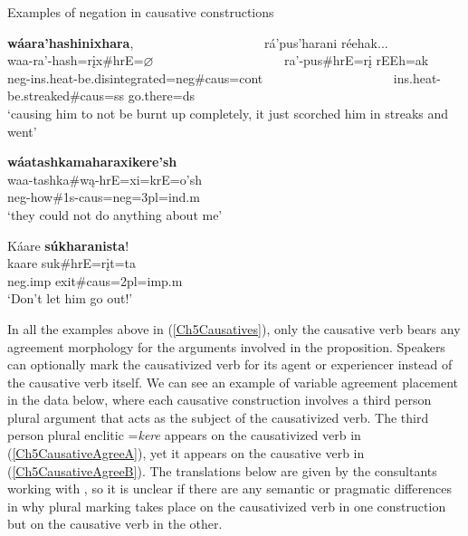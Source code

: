 \begin{exe}
    \item\label{Ch5Causatives2} Examples of negation in causative constructions

    \begin{xlist}
        \item\label{Ch5CausativesE} \glll \textbf{wáara'hashinixhara}, ~ ~ ~ ~ ~ ~ ~ ~ ~ ~ ~ ~ rá'pus'harani réehak...\\
	waa-ra'-hash=rįx\#hrE=$\varnothing$ ~ ~ ~ ~ ~ ~ ~ ~ ~ ~ ~ ~  ra'-pus\#hrE=rį rEEh=ak\\
	neg-ins.heat-\textnormal{be.disintegrated}=neg\#caus=cont ~ ~ ~ ~ ~ ~ ~ ~ ~ ~ ~ ~ ins.heat-\textnormal{be.streaked}\#caus=ss \textnormal{go.there}=ds\\
	\glt `causing him to not be burnt up completely, it just scorched him in streaks and went' \citep[154]{hollow1973a}

    \item\label{Ch5CausativesF} \glll \textbf{wáatashkamaharaxikere'sh}\\
    waa-tashka\#wą-hrE=xi=krE=o'sh\\
    neg-\textnormal{how}\#1s-caus=neg=3pl=ind.m\\
    \glt `they could not do anything about me' \citep[319]{hollow1973b}

    \item\label{Ch5CausativesG} \glll Káare \textbf{súkharanista}!\\
    kaare suk\#hrE=rįt=ta\\
    neg.imp \textnormal{exit}\#caus=2pl=imp.m\\
    \glt `Don't let him go out!' \citep[57]{trechter2012b}
        
    \end{xlist}
\end{exe}

In all the examples above in (\ref{Ch5Causatives}), only the causative verb bears any agreement morphology for the arguments involved in the proposition. Speakers can optionally mark the causativized verb for its agent or experiencer instead of the causative verb itself. We can see an example of variable agreement placement in the data below, where each causative construction involves a third person plural argument that acts as the subject of the causativized verb. The third person plural enclitic =\textit{kere} appears on the causativized verb in (\ref{Ch5CausativeAgreeA}), yet it appears on the causative verb in (\ref{Ch5CausativeAgreeB}). The translations below are given by the consultants working with \citet{hollow1973a}, so it is unclear if there are any semantic or pragmatic differences in why plural marking takes place on the causativized verb in one construction but on the causative verb in the other.

